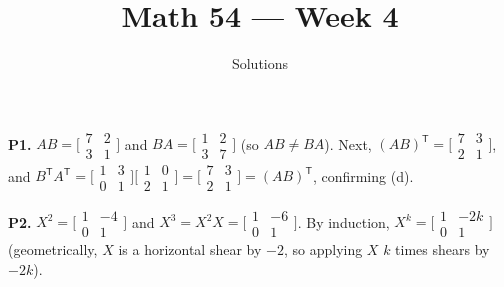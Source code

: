\documentclass[10pt]{scrartcl}
\title{Math 54 --- Week 4}
\subtitle{Solutions}
\author{}\date{}\ihead{}
\begin{document}
\maketitle

\begin{prob}\textbf{P1.}
$AB=\bigl[\begin{smallmatrix}7&2\\3&1\end{smallmatrix}\bigr]$ and $BA=\bigl[\begin{smallmatrix}1&2\\3&7\end{smallmatrix}\bigr]$ (so $AB\ne BA$). Next, $(AB)^{\mathsf T}=\bigl[\begin{smallmatrix}7&3\\2&1\end{smallmatrix}\bigr]$, and $B^{\mathsf T}A^{\mathsf T}=\bigl[\begin{smallmatrix}1&3\\0&1\end{smallmatrix}\bigr]\bigl[\begin{smallmatrix}1&0\\2&1\end{smallmatrix}\bigr]=\bigl[\begin{smallmatrix}7&3\\2&1\end{smallmatrix}\bigr]=(AB)^{\mathsf T}$, confirming (d).
\end{prob}

\begin{prob}\textbf{P2.}
$X^2=\bigl[\begin{smallmatrix}1&-4\\0&1\end{smallmatrix}\bigr]$ and $X^3=X^2X=\bigl[\begin{smallmatrix}1&-6\\0&1\end{smallmatrix}\bigr]$. By induction, $X^k=\bigl[\begin{smallmatrix}1&-2k\\0&1\end{smallmatrix}\bigr]$ (geometrically, $X$ is a horizontal shear by $-2$, so applying $X$ $k$ times shears by $-2k$).
\end{prob}
\end{document}
